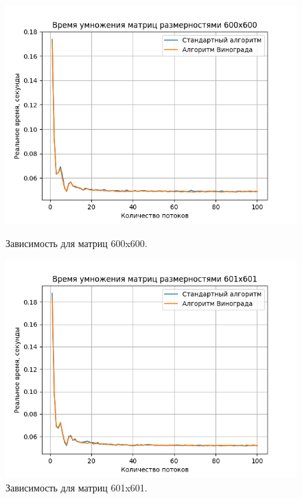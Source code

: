 \documentclass[a4paper,12pt]{article}
\begin{document}
\begin{figure}[H]
\begin{center}
\begin{minipage}[H]{0.48\linewidth}
\includegraphics[width=1\linewidth]{600x600.png}
\caption{Зависимость для матриц 600x600.}
\label{ris:experimoriginal}
\end{minipage}
\hfill
\begin{minipage}[H]{0.48\linewidth}
\includegraphics[width=1\linewidth]{601x601.png}
\caption{Зависимость для матриц 601x601.}
\label{ris:experimcoded}
\end{minipage}
\end{center}
\end{figure}
\end{document}
